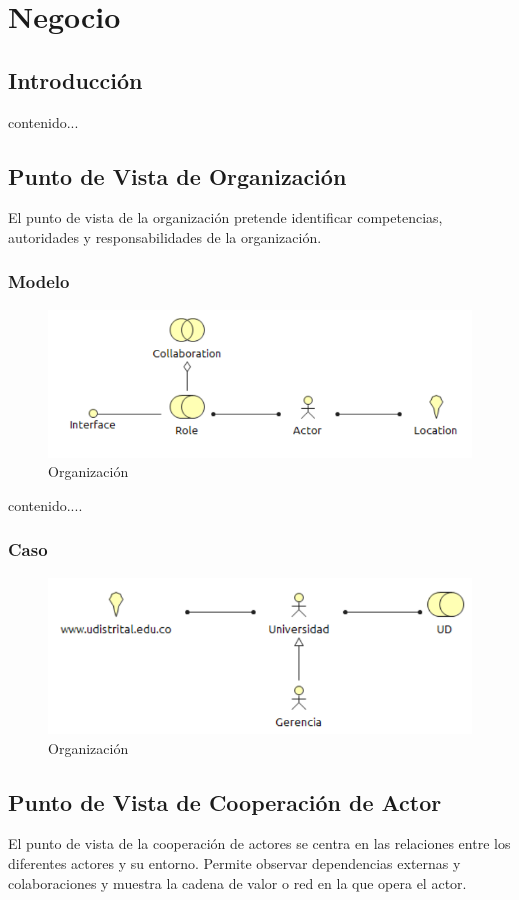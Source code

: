 \chapter{Negocio}
\section{Introducción}
contenido...
\newpage
\section{Punto de Vista de Organización}
El punto de vista de la organización pretende identificar competencias, autoridades y responsabilidades de la organización.
\subsection{Modelo}
\begin{figure}[th!]
	\centering
	\includegraphics[width=0.8\linewidth]{arquitectura_diseno/imgs/M_Organizacion}
	\caption{Organización}
\end{figure}
\newpage
contenido....
\subsection{Caso}
\begin{figure}[th!]
	\centering
	\includegraphics[width=0.8\linewidth]{arquitectura_diseno/imgs/C_Organizacion}
	\caption{Organización}
\end{figure}
\newpage
\section{Punto de Vista de Cooperación de Actor}
El punto de vista de la cooperación de actores se centra en las relaciones entre los diferentes actores y su entorno. Permite observar dependencias externas y colaboraciones y muestra la cadena de valor o red en la que opera el actor.
